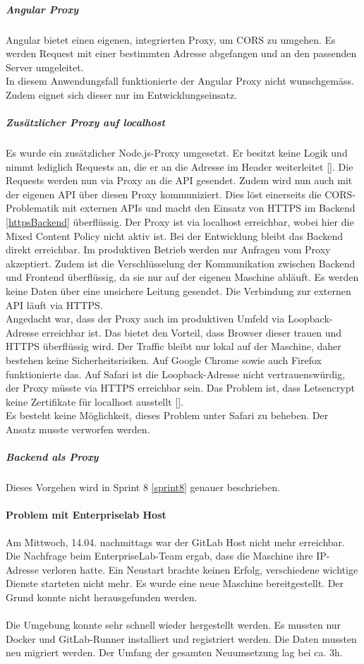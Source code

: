 \subparagraph{Angular Proxy}
Angular bietet einen eigenen, integrierten Proxy, um \ac{CORS} zu umgehen. Es werden Request mit einer bestimmten Adresse abgefangen und an den passenden Server umgeleitet.\\
In diesem Anwendungsfall funktionierte der Angular Proxy nicht wunschgemäss. Zudem eignet sich dieser nur im Entwicklungseinsatz. 

\subparagraph{Zusätzlicher Proxy auf localhost}\label{corsLocalhost}
Es wurde ein zusätzlicher Node.js-Proxy umgesetzt. Er besitzt keine Logik und nimmt lediglich Requests an, die er an die Adresse im Header weiterleitet [\cite{corsProxy}]. Die Requests werden nun via Proxy an die API gesendet. Zudem wird nun auch mit der eigenen API über diesen Proxy kommuniziert. Dies löst einerseits die \ac{CORS}-Problematik mit externen APIs und macht den Einsatz von HTTPS im Backend \ref{httpsBackend} überflüssig. Der Proxy ist via localhost erreichbar, wobei hier die Mixed Content Policy nicht aktiv ist. Bei der Entwicklung bleibt das Backend direkt erreichbar. Im produktiven Betrieb werden nur Anfragen vom Proxy akzeptiert. 
\newpage
Zudem ist die Verschlüsselung der Kommunikation zwischen Backend und Frontend überflüssig, da sie nur auf der eigenen Maschine abläuft. Es werden keine Daten über eine unsichere Leitung gesendet.
Die Verbindung zur externen API läuft via HTTPS. \\
Angedacht war, dass der Proxy auch im produktiven Umfeld via Loopback-Adresse erreichbar ist. Das bietet den Vorteil, dass Browser dieser trauen und HTTPS überflüssig wird. Der Traffic bleibt nur lokal auf der Maschine, daher bestehen keine Sicherheitsrisiken. Auf Google Chrome sowie auch Firefox funktionierte das. Auf Safari ist die Loopback-Adresse nicht vertrauenswürdig, der Proxy müsste via HTTPS erreichbar sein. Das Problem ist, dass Letsencrypt keine Zertifikate für localhost ausstellt [\cite{letsencryptLocalhost}].\\
Es besteht keine Möglichkeit, dieses Problem unter Safari zu beheben. Der Ansatz musste verworfen werden. 

\subparagraph{Backend als Proxy}
Dieses Vorgehen wird in Sprint 8 \ref{sprint8} genauer beschrieben. 
\paragraph{Problem mit Enterpriselab Host}
Am Mittwoch, 14.04. nachmittags war der GitLab Host nicht mehr erreichbar. Die Nachfrage beim \gls{EnterpriseLab}-Team ergab, dass die Maschine ihre IP-Adresse verloren hatte. Ein Neustart brachte keinen Erfolg, verschiedene wichtige Dienste starteten nicht mehr. Es wurde eine neue Maschine bereitgestellt. Der Grund konnte nicht herausgefunden werden. \\\\
Die Umgebung konnte sehr schnell wieder hergestellt werden. Es mussten nur Docker und GitLab-Runner installiert und registriert werden. Die Daten mussten neu migriert werden. Der Umfang der gesamten Neuumsetzung lag bei ca. 3h. 


